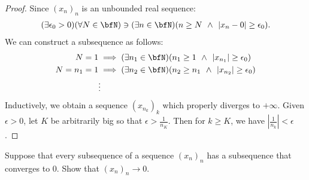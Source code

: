 \documentclass[10pt,twoside,openany]{memoir}
\begin{document}
        \begin{proof}
            Since $(x_n)_n$ is an unbounded real sequence:
                \begin{equation*}
                \begin{split}
                    (\exists \epsilon_0 > 0)(\forall N \in \bfN) \ni (\exists n \in \bfN)(n \geq N \hspace{4pt}\land\hspace{4pt}|x_n - 0| \geq \epsilon_0).
                \end{split}
                \end{equation*}
            We can construct a subsequence as follows:
                \begin{equation*}
                \begin{split}
                    N = 1 &\implies (\exists n_1 \in \bfN)(n_1 \geq 1 \hspace{4pt}\land\hspace{4pt} |x_{n_1}| \geq \epsilon_0)\\
                    N = n_1 = 1 & \implies (\exists n_2 \in \bfN)(n_2 \geq n_1 \hspace{4pt}\land\hspace{4pt} |x_{n_2}| \geq \epsilon_0)\\
                    &\vdots
                \end{split}
                \end{equation*}
            Inductively, we obtain a sequence $(x_{n_k})_k$ which properly diverges to $+\infty$. Given $\epsilon > 0$, let $K$ be arbitrarily big so that $\epsilon > \frac{1}{n_K}$. Then for $k \geq K$, we have $\left|\frac{1}{n_k}\right| < \epsilon$.
        \end{proof}
    \begin{exercise}
        Suppose that every subsequence of a sequence $(x_n)_n$ has a subsequence that converges to $0$. Show that $(x_n)_n \rightarrow 0$.
    \end{exercise}
\end{document}
